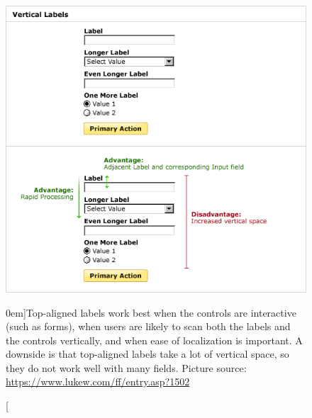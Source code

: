 \begin{figure}%
  \includegraphics[width=\textwidth]{../figures/vertical_align.png}
  \caption[][0em]{Top-aligned labels work best when the controls are interactive (such as forms), when users are likely to scan both the labels and the controls vertically, and when ease of localization is important. A downside is that top-aligned labels take a lot of vertical space, so they do not work well with many fields. \newline Picture source: \url{https://www.lukew.com/ff/entry.asp?1502}}
  \label{fig:vertical_align}
\end{figure}

